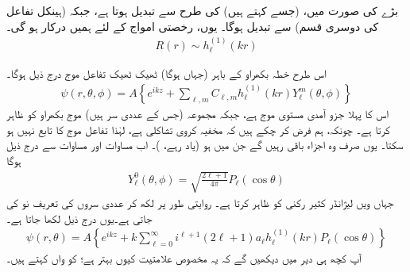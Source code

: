 بڑے   کی صورت میں،    (جسے     کہتے ہیں)   کی طرح  سے تبدیل ہوتا ہے،  جبکہ   (ہینکل تفاعل کی دوسری قسم)    سے تبدیل ہوگا۔ یوں،  رخصتی امواج کے لئے ہمیں   درکار ہو گی۔
\begin{align}
	R(r)\sim h^{(1)}_{\ell}(kr)
\end{align}

 اس طرح خطہ بکھراو کے باہر  (جہاں  ہوگا)    ٹھیک ٹھیک  تفاعل موج درج ذیل ہوگا۔ 
\begin{align}
	\psi(r, \theta, \phi) = A\left\{e^{ikz}+\sum_{\ell, m}C_{\ell, m}h^{(1)}_{\ell}(kr)Y^m_{\ell}(\theta, \phi)\right\}
\end{align}
اس کا پہلا جزو آمدی مستوی موج ہے،  جبکہ مجموعہ (جس کے عددی سر  ہیں)  موج بکھراو کو ظاہر کرتا ہے۔ چونکہ،  ہم فرض کر چکے ہیں کہ مخفیہ کروی تشاکلی ہے،  لہٰذا تفاعل موج  کا  تابع نہیں ہو سکتا۔   یوں صرف وہ اجزاء باقی رہیں گے جن میں  ہو   (یاد رہے،  )۔  اب مساوات   اور  مساوات  سے درج ذیل ہوگا
\begin{align}
	Y^0_{\ell}(\theta, \phi) = \sqrt{\frac{2\ell+1}{4\pi}}P_{\ell}(\cos\theta)
\end{align}
جہاں  ویں لیژانڈر کثیر رکنی کو   ظاہر کرتا ہے۔ روایتی طور پر  لکھ کر عددی سروں کی تعریف نو   کی جاتی ہے۔یوں درج ذیل لکھا جاتا ہے۔
\begin{align}\label{مساوات_بکھراو_بیرونی_حل}
	\psi(r, \theta) = A\left\{e^{ikz}+k\sum_{\ell=0}^{\infty}i^{\ell+1}(2\ell+1)a_{\ell}h_{\ell}^{(1)}(kr)P_{\ell}(\cos\theta)\right\}
\end{align}
آپ کچھ ہی دیر میں دیکھیں گے کہ یہ مخصوص علامتیت کیوں بہتر ہے؛   کو  واں      کہتے ہیں۔


